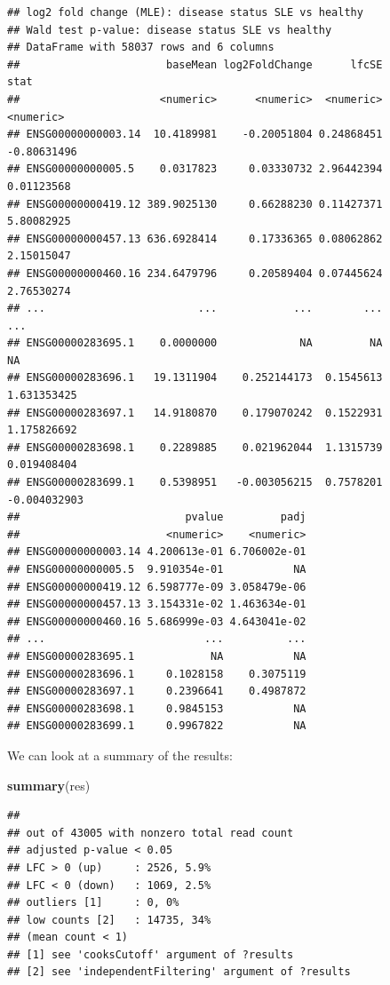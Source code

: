 \documentclass[9pt,a4paper,]{extarticle}
\newenvironment{Shaded}{\begin{snugshade}}{\end{snugshade}}
\newcommand{\KeywordTok}[1]{\textcolor[rgb]{0.13,0.29,0.53}{\textbf{#1}}}
\newcommand{\NormalTok}[1]{#1}
\begin{document}
\begin{verbatim}
## log2 fold change (MLE): disease status SLE vs healthy 
## Wald test p-value: disease status SLE vs healthy 
## DataFrame with 58037 rows and 6 columns
##                       baseMean log2FoldChange      lfcSE         stat
##                      <numeric>      <numeric>  <numeric>    <numeric>
## ENSG00000000003.14  10.4189981    -0.20051804 0.24868451  -0.80631496
## ENSG00000000005.5    0.0317823     0.03330732 2.96442394   0.01123568
## ENSG00000000419.12 389.9025130     0.66288230 0.11427371   5.80082925
## ENSG00000000457.13 636.6928414     0.17336365 0.08062862   2.15015047
## ENSG00000000460.16 234.6479796     0.20589404 0.07445624   2.76530274
## ...                        ...            ...        ...          ...
## ENSG00000283695.1    0.0000000             NA         NA           NA
## ENSG00000283696.1   19.1311904    0.252144173  0.1545613  1.631353425
## ENSG00000283697.1   14.9180870    0.179070242  0.1522931  1.175826692
## ENSG00000283698.1    0.2289885    0.021962044  1.1315739  0.019408404
## ENSG00000283699.1    0.5398951   -0.003056215  0.7578201 -0.004032903
##                          pvalue         padj
##                       <numeric>    <numeric>
## ENSG00000000003.14 4.200613e-01 6.706002e-01
## ENSG00000000005.5  9.910354e-01           NA
## ENSG00000000419.12 6.598777e-09 3.058479e-06
## ENSG00000000457.13 3.154331e-02 1.463634e-01
## ENSG00000000460.16 5.686999e-03 4.643041e-02
## ...                         ...          ...
## ENSG00000283695.1            NA           NA
## ENSG00000283696.1     0.1028158    0.3075119
## ENSG00000283697.1     0.2396641    0.4987872
## ENSG00000283698.1     0.9845153           NA
## ENSG00000283699.1     0.9967822           NA
\end{verbatim}

We can look at a summary of the results:

\begin{Shaded}
\begin{Highlighting}[]
\KeywordTok{summary}\NormalTok{(res)}
\end{Highlighting}
\end{Shaded}

\begin{verbatim}
## 
## out of 43005 with nonzero total read count
## adjusted p-value < 0.05
## LFC > 0 (up)     : 2526, 5.9% 
## LFC < 0 (down)   : 1069, 2.5% 
## outliers [1]     : 0, 0% 
## low counts [2]   : 14735, 34% 
## (mean count < 1)
## [1] see 'cooksCutoff' argument of ?results
## [2] see 'independentFiltering' argument of ?results
\end{verbatim}
\end{document}
